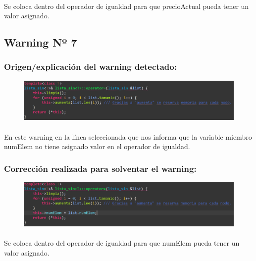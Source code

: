 			\paragraph{}Se coloca dentro del operador de igualdad para que precioActual pueda tener un valor asignado.
			
	\subsection{Warning Nº 7}
		
		\subsubsection{Origen/explicación del warning detectado:}
		
			\begin{figure}[H]
				\centering
				\includegraphics[scale=0.55]{img/esteban6.png}
				\label{esteban6}
			\end{figure}
		
			\paragraph{}En este warning en la línea seleccionada que nos informa que la variable miembro numElem no tiene asignado valor en el operador de igualdad.
			
		\subsubsection{Corrección realizada para solventar el warning:}
		
			\begin{figure}[H]
				\centering
				\includegraphics[scale=0.55]{img/esteban7.png}
				\label{esteban7}
			\end{figure}
		
			\paragraph{}Se coloca dentro del operador de igualdad para que numElem pueda tener un valor asignado.
			
